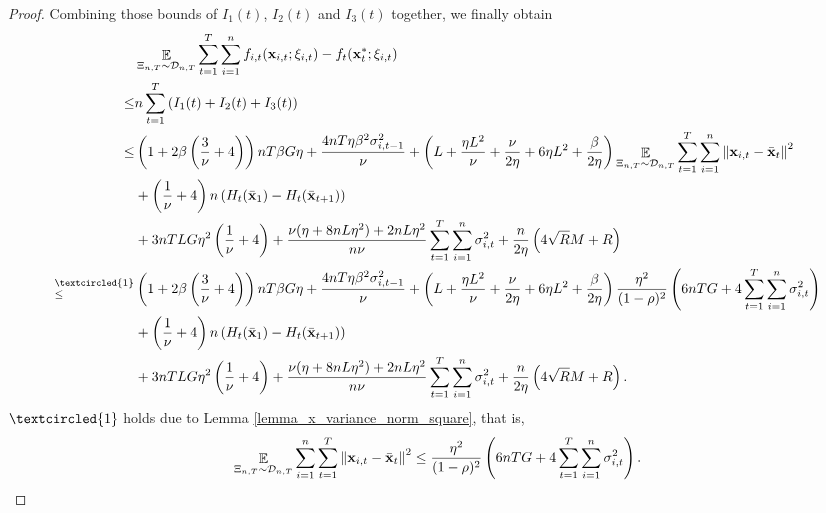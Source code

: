 \documentclass{article}
\begin{document}
\begin{proof}
Combining those bounds of $I_1(t)$, $I_2(t)$ and $I_3(t)$ together, we finally obtain
\begin{align}
\nonumber
& \EE_{ \Xi_{n,T} \sim \Dcal_{n,T} } \sum_{t=1}^T\sum_{i=1}^n f_{i,t}(\x_{i,t};\xi_{i,t}) - f_t(\x_t^\ast;\xi_{i,t}) \\ \nonumber
\le & n \sum_{t=1}^T \lrincir{ I_1(t) + I_2(t) + I_3(t) } \\ \nonumber
\le & \lrincir{1 + 2\beta\lrincir{\frac{3}{\nu}+4}}nT\beta G \eta + \frac{4nT\eta \beta^2 \sigma_{i,t-1}^2}{\nu} + \lrincir{ L + \frac{\eta L^2}{\nu} + \frac{\nu}{2\eta} + 6\eta L^2  + \frac{\beta}{2\eta} }\EE_{ \Xi_{n,T} \sim \Dcal_{n,T} }\sum_{t=1}^T\sum_{i=1}^n\lrnorm{\x_{i,t} - \bar{\x}_t }^2 \\ \nonumber 
&+ \lrincir{\frac{1}{\nu} + 4}n\lrincir{H_t(\bar{\x}_1) - H_t(\bar{\x}_{t+1})}  \\ \nonumber 
& + 3nTLG\eta^2\lrincir{ \frac{1}{\nu} + 4 } + \frac{\nu(\eta + 8nL\eta^2) + 2nL\eta^2}{n\nu} \sum_{t=1}^T\sum_{i=1}^n\sigma_{i,t}^2  + \frac{n}{2\eta}\lrincir{ 4\sqrt{R}M + R  } \\ \nonumber
\refabovecir{\le}{\textcircled{1}} & \lrincir{1 + 2\beta\lrincir{\frac{3}{\nu}+4}}nT\beta G \eta + \frac{4nT\eta \beta^2 \sigma_{i,t-1}^2}{\nu} + \lrincir{ L + \frac{\eta L^2}{\nu} + \frac{\nu}{2\eta} + 6\eta L^2  + \frac{\beta}{2\eta} }\frac{\eta^2}{(1-\rho)^2}   \lrincir{ 6nTG + 4\sum_{t=1}^T\sum_{i=1}^n \sigma_{i,t}^2 } \\ \nonumber 
&+ \lrincir{\frac{1}{\nu} + 4}n\lrincir{H_t(\bar{\x}_1) - H_t(\bar{\x}_{t+1})}  \\ \nonumber 
& + 3nTLG\eta^2\lrincir{ \frac{1}{\nu} + 4 } + \frac{\nu(\eta + 8nL\eta^2) + 2nL\eta^2}{n\nu} \sum_{t=1}^T\sum_{i=1}^n\sigma_{i,t}^2  + \frac{n}{2\eta}\lrincir{ 4\sqrt{R}M + R  }.
\end{align}  $\textcircled{1}$ holds due to Lemma \ref{lemma_x_variance_norm_square}, that is, 
\begin{align}
\nonumber
\mathop{\mathbb{E}}_{ \Xi_{n,T}\sim \mathcal{D}_{n,T} } \sum_{i=1}^n\sum_{t=1}^T \left\lVert{\bf x}_{i,t} - \bar{{\bf x}}_t\right\rVert^2 \le \frac{\eta^2}{(1-\rho)^2}   \left(  6nTG + 4\sum_{t=1}^T\sum_{i=1}^n \sigma_{i,t}^2  \right).
\end{align}



\end{proof}
\end{document}
